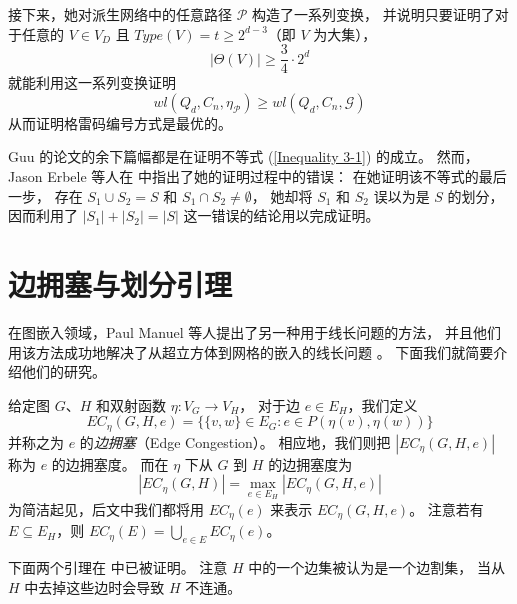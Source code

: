 接下来，她对派生网络中的任意路径 $\mathcal{P}$ 构造了一系列变换，
并说明只要证明了对于任意的 $V \in V_D$ 且 $Type(V) = t \ge 2^{d - 3}$（即 $V$ 为大集），
\begin{equation}
\label{Inequality 3-1}
|\Theta(V)| \ge \frac{3}{4} \cdot 2^d
\end{equation}
就能利用这一系列变换证明
\begin{equation*}
wl(Q_d, C_n, \eta_\mathcal{P}) \ge wl(Q_d, C_n, \mathcal{G})
\end{equation*}
从而证明格雷码编号方式是最优的。

Guu 的论文的余下篇幅都是在证明不等式 (\ref{Inequality 3-1}) 的成立。
然而，Jason Erbele 等人在 \cite{Erbele.2003} 中指出了她的证明过程中的错误：
在她证明该不等式的最后一步，
存在 $S_1 \cup S_2 = S$ 和 $S_1 \cap S_2 \neq \emptyset$，
她却将 $S_1$ 和 $S_2$ 误以为是 $S$ 的划分，
因而利用了 $|S_1| + |S_2| = |S|$ 这一错误的结论用以完成证明。

\section{边拥塞与划分引理}
\label{Section 3.3}

在图嵌入领域，Paul Manuel 等人提出了另一种用于线长问题的方法，
并且他们用该方法成功地解决了从超立方体到网格的嵌入的线长问题 \cite{Manuel.2009}。
下面我们就简要介绍他们的研究。

给定图 $G$、$H$ 和双射函数 $\eta \colon V_G \rightarrow V_H$，
对于边 $e \in E_H$，我们定义
\begin{equation*}
EC_\eta(G, H, e) = \{\{v, w\} \in E_G \colon e \in P(\eta(v), \eta(w))\}
\end{equation*}
并称之为 $e$ 的\emph{边拥塞}（Edge Congestion）。
相应地，我们则把 $|EC_\eta(G, H, e)|$ 称为 $e$ 的边拥塞度。
而在 $\eta$ 下从 $G$ 到 $H$ 的边拥塞度为
\begin{equation*}
|EC_\eta(G, H)| = \max_{e \in E_H} |EC_\eta(G, H, e)|
\end{equation*}
为简洁起见，后文中我们都将用 $EC_\eta(e)$ 来表示 $EC_\eta(G, H, e)$。
注意若有 $E \subseteq E_H$，则 $EC_\eta(E) = \bigcup_{e \in E} EC_\eta(e)$。

下面两个引理在 \cite{Manuel.2009} 中已被证明。
注意 $H$ 中的一个边集被认为是一个边割集，
当从 $H$ 中去掉这些边时会导致 $H$ 不连通。

